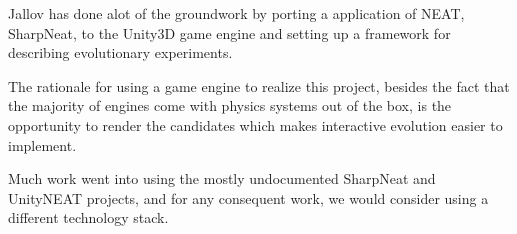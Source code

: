 Jallov has done alot of the groundwork by porting a application of NEAT, 
SharpNeat\cite{web:sharpneat}, to the Unity3D game engine and 
setting up a framework for describing evolutionary 
experiments\cite{web:unityneat}.

The rationale for using  a game engine to realize  this project, besides 
the fact that the majority of engines come with physics systems out of 
the box, is the opportunity to render the candidates which makes interactive 
evolution\cite{Takagi2001} easier to implement.

Much work went into using the mostly undocumented SharpNeat and UnityNEAT
projects, and for any consequent work, we would consider using a different
technology stack.

